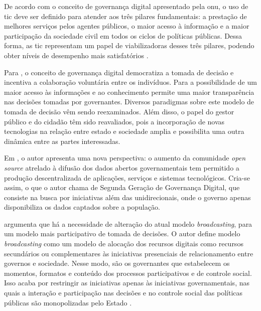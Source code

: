 \par
De acordo com o conceito de governança digital apresentado pela \acrshort{onu}, o uso de \acrshort{tic} deve ser definido para atender aos três pilares fundamentais: 
a prestação de melhores serviços pelos agentes públicos, o maior acesso à informação e a maior participação da sociedade civil em todos os ciclos de políticas públicas. 
Dessa forma, as \acrshort{tic} representam um papel de viabilizadoras desses três pilares, podendo obter níveis de desempenho mais satisfatórios \cite{onu2018}. 

\par
Para , o conceito de governança digital democratiza a tomada de decisão e incentiva a colaboração voluntária entre os indivíduos. Para  a possibilidade de um maior acesso às informações e ao conhecimento permite uma maior transparência nas decisões tomadas por governantes. Diversos paradigmas sobre este modelo de tomada de decisão vêm sendo reexaminados. Além disso, o papel do gestor público e do cidadão têm sido reavaliados, pois a incorporação 
de novas tecnologias na relação entre estado e sociedade amplia e possibilita uma outra dinâmica entre as partes interessadas. 

\par
Em , o autor apresenta uma nova perspectiva: o aumento da comunidade \textit{open source} atrelado à difusão dos dados abertos governamentais tem permitido a produção descentralizada de aplicações, serviços e sistemas tecnológicos. Cria-se assim, o que o autor chama de Segunda Geração de Governança Digital, 
que consiste na busca por iniciativas além das unidirecionais, onde o governo apenas disponibiliza os dados captados sobre a população.

\par

 argumenta que há a necessidade de alteração do atual modelo \textit{broadcasting}, para um modelo mais participativo de tomada de decisões. 
O autor define modelo \textit{broadcasting} como um modelo de alocação dos recursos digitais como recursos secundários ou complementares 
às iniciativas presenciais de relacionamento entre governos e sociedade. Nesse modo, são os governantes que estabelecem os momentos, formatos e conteúdo dos processos 
participativos e de controle social. Isso acaba por restringir as iniciativas apenas às iniciativas governamentais, nas quais a interação e participação nas decisões e no
controle social das políticas públicas são monopolizadas pelo Estado \cite{parra2017governancca}.

